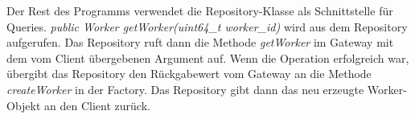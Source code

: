 \documentclass[a4paper,12pt]{article}
\begin{document}
Der Rest des Programms verwendet die Repository-Klasse als Schnittstelle für Queries. \textit{public Worker getWorker(uint64\_t worker\_id)} wird aus dem Repository aufgerufen. Das Repository ruft dann die Methode \textit{getWorker} im Gateway mit dem vom Client übergebenen Argument auf. Wenn die Operation erfolgreich war, übergibt das Repository den Rückgabewert vom Gateway an die Methode \textit{createWorker} in der Factory. Das Repository gibt dann das neu erzeugte Worker-Objekt an den Client zurück.

\printnoidxglossaries
\end{document}
